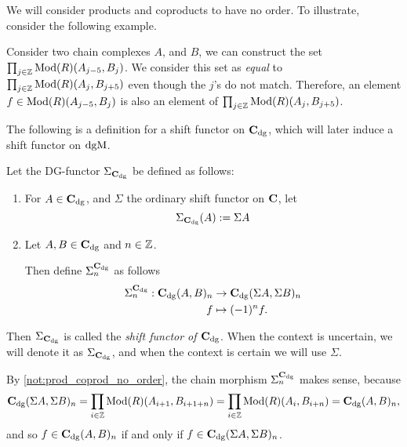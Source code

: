 \begin{notation}
    \label{not:prod_coprod_no_order}
    We will consider products and coproducts to have no order. To illustrate, consider the following example.

    Consider two chain complexes \( A \), and \( B \), we can construct the set \( \prod_{j \in {\mathbb{Z}}} \operatorname{Mod}(R)(A_{j - 5}, B_j) \). We consider this set as \emph{equal} to \( \prod_{j \in {\mathbb{Z}}} \operatorname{Mod}(R)(A_j, B_{j + 5}) \) even though the \( j \)'s do not match. Therefore, an element \( f \in \operatorname{Mod}(R)(A_{j - 5}, B_j) \) is also an element of \( \prod_{j \in {\mathbb{Z}}} \operatorname{Mod}(R)(A_j, B_{j + 5}) \).
\end{notation}

The following is a definition for a shift functor on \( \C_{\dg} \), which will later induce a shift functor on \( \operatorname{dgM} \).

\begin{definition}[Shift in \( \C_{\dg} \)]
    \label{def:sigma_c_dg}
    Let the DG-functor \( \Sigma_{\operatorname{\mathbf{C}}_{\operatorname{dg}}} \) be defined as follows:
    \begin{enumerate}
        \item {
            For \( A \in \operatorname{\mathbf{C}}_{\operatorname{dg}} \), and \( \Sigma \) the ordinary shift functor on \( \operatorname{\mathbf{C}} \), let
            \[
                \Sigma_{\operatorname{\mathbf{C}}_{\operatorname{dg}}}(A) := \Sigma A
            \]
        }
        \item {
            Let \( A, B \in \operatorname{\mathbf{C}}_{\operatorname{dg}} \) and \( n \in {\mathbb{Z}} \).

            Then define \( \Sigma_n^{\operatorname{\mathbf{C}}_{\operatorname{dg}}} \) as follows
            \begin{align*}
                \Sigma_n^{\operatorname{\mathbf{C}}_{\operatorname{dg}}}: \operatorname{\mathbf{C}}_{\operatorname{dg}}(A, B)_n &\to \operatorname{\mathbf{C}}_{\operatorname{dg}}(\Sigma A, \Sigma B)_n \\
                f &\mapsto (-1)^n f.
            \end{align*}
        }
    \end{enumerate}
    Then \( \Sigma_{\operatorname{\mathbf{C}}_{\operatorname{dg}}} \) is called the \emph{shift functor of \( \C_{\dg} \)}. When the context is uncertain, we will denote it as \( \Sigma_{\operatorname{\mathbf{C}}_{\operatorname{dg}}} \), and when the context is certain we will use \( \Sigma \).
\end{definition}

By \autoref{not:prod_coprod_no_order}, the chain morphism \( \Sigma_n^{\operatorname{\mathbf{C}}_{\operatorname{dg}}} \) makes sense, because
\[
    \operatorname{\mathbf{C}}_{\operatorname{dg}}(\Sigma A, \Sigma B)_n  = \prod_{i \in {\mathbb{Z}}} \operatorname{Mod}(R)(A_{i + 1}, B_{i + 1 + n}) = \prod_{i \in {\mathbb{Z}}} \operatorname{Mod}(R)(A_i, B_{i + n}) = \operatorname{\mathbf{C}}_{\operatorname{dg}}(A, B)_n,
\]
and so \( f \in \operatorname{\mathbf{C}}_{\operatorname{dg}}(A, B)_n \) if and only if \( f \in \operatorname{\mathbf{C}}_{\operatorname{dg}}(\Sigma A, \Sigma B)_n \).

